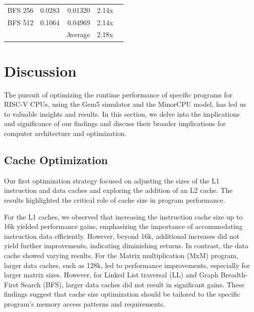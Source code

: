 \documentclass[
	article,			%
	11pt,				%
	oneside,			%
	a4paper,			%
	brazil,				%
        english,			%
	sumario=tradicional
	]{abntex2}
\begin{document}
\begin{table}[]
\begin{tabular}{|lr|r|r|l}
\multicolumn{1}{|l|}{BFS 256}          & 0.0283                                 & 0.01320                                     & 2.14x                                  &  \\ \cline{1-4}
\multicolumn{1}{|l|}{BFS 512}          & 0.1064                                 & 0.04969                                     & 2.14x                                  &  \\ \cline{1-4}
\multicolumn{2}{|l|}{}                                                          & Average                                     & 2.18x                                  &  \\ \cline{1-4}
\end{tabular}
\end{table}

\section{Discussion}
The pursuit of optimizing the runtime performance of specific programs for RISC-V CPUs, using the Gem5 simulator and the MinorCPU model, has led us to valuable insights and results. In this section, we delve into the implications and significance of our findings and discuss their broader implications for computer architecture and optimization.

\subsection{Cache Optimization}
Our first optimization strategy focused on adjusting the sizes of the L1 instruction and data caches and exploring the addition of an L2 cache. The results highlighted the critical role of cache size in program performance.

For the L1 caches, we observed that increasing the instruction cache size up to 16k yielded performance gains, emphasizing the importance of accommodating instruction data efficiently. However, beyond 16k, additional increases did not yield further improvements, indicating diminishing returns. In contrast, the data cache showed varying results. For the Matrix multiplication (MxM) program, larger data caches, such as 128k, led to performance improvements, especially for larger matrix sizes. However, for Linked List traversal (LL) and Graph Breadth-First Search (BFS), larger data caches did not result in significant gains. These findings suggest that cache size optimization should be tailored to the specific program's memory access patterns and requirements.
\end{document}
